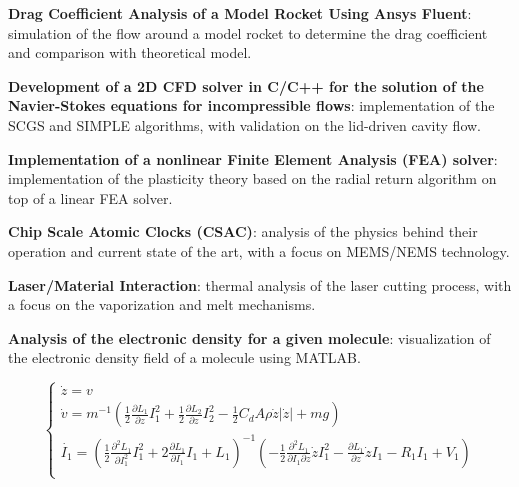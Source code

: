 \begin{cventries}
{\begin{cvitems}
            \item {\textbf{Drag Coefficient Analysis of a Model Rocket Using Ansys Fluent}: simulation of the flow around a model rocket to determine the drag coefficient and comparison with theoretical model.}
            \item {\textbf{Development of a 2D CFD solver in C/C++ for the solution of the Navier-Stokes equations for incompressible flows}: implementation of the SCGS and SIMPLE algorithms, with validation on the lid-driven cavity flow.}
            \item {\textbf{Implementation of a nonlinear Finite Element Analysis (FEA) solver}: implementation of the plasticity theory based on the radial return algorithm on top of a linear FEA solver.}
            \item {\textbf{Chip Scale Atomic Clocks (CSAC)}: analysis of the physics behind their operation and current state of the art, with a focus on MEMS/NEMS technology.}
            \item {\textbf{Laser/Material Interaction}: thermal analysis of the laser cutting process, with a focus on the vaporization and melt mechanisms.}
            \item {\textbf{Analysis of the electronic density for a given molecule}: visualization of the electronic density field of a molecule using MATLAB.}
        \end{cvitems}
        \vspace{9pt}
        \begin{minipage}{\textwidth}
            \begin{minipage}{0.65\textwidth}
                \begin{equation*}
                    \begin{cases}
                        \dot{z} = v                                                                                                                                                                                                                                                                                   \\
                        \dot{v} = m^{-1} \left(\frac{1}{2} \frac{\partial L_1}{\partial z} I_1^2 + \frac{1}{2} \frac{\partial L_2}{\partial z} I_2^2 - \frac{1}{2} C_d A \rho \dot{z} |\dot{z}| + m g  \right)                                                                                                        \\
                        \dot{I_1} = \left( \frac{1}{2} \frac{\partial^2 L_1}{\partial I_1^2} I_1^2 + 2\frac{\partial L_1}{\partial I_1} I_1 + L_1 \right)^{-1} \left( -\frac{1}{2} \frac{\partial^2 L_1}{\partial I_1 \partial z} \dot{z} I_1^2 - \frac{\partial L_1}{\partial z} \dot{z} I_1 - R_1 I_1 + V_1 \right) \\

\end{cases}
\end{equation*}
\end{minipage}
\end{minipage}}
\end{cventries}

